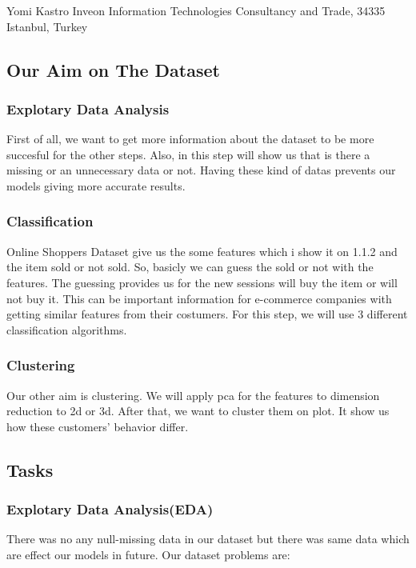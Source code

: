 \documentclass[onecolumn]{article}
\begin{document}
Yomi Kastro Inveon Information Technologies Consultancy and Trade, 34335 Istanbul, Turkey\\

\maketitle

\subsection{Our Aim on The Dataset}
\subsubsection{Explotary Data Analysis}

First of all, we want to get more information about the dataset to be more succesful for the other steps. Also, in this step will show us that is there a missing or an unnecessary data or not. Having these kind of datas prevents our models giving more accurate results.


\subsubsection{Classification}

Online Shoppers Dataset give us the some features which i show it on 1.1.2 and the item sold or not sold. So, basicly we can guess the sold or not with the features. The guessing provides us for the new sessions will buy the item or will not buy it. This can be important information for e-commerce companies with getting similar features from their costumers. For this step, we will use 3 different classification algorithms.\\

\subsubsection{Clustering}

Our other aim is clustering. We will apply pca for the features to dimension reduction to 2d or 3d. After that, we want to cluster them on plot. It show us how these customers' behavior differ.\\


\subsection{Tasks}
\subsubsection{Explotary Data Analysis(EDA)}
There was no any null-missing data in our dataset but there was same data which are effect our models in future. Our dataset problems are:\\
\end{document}
